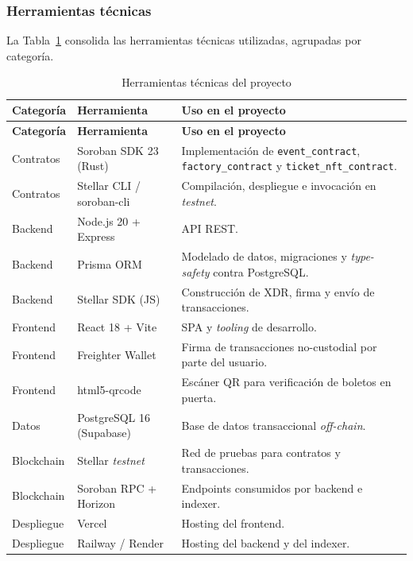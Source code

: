 \documentclass[12pt,oneside]{report}
\begin{document}
      \subsubsection{Herramientas técnicas}
      La Tabla~\ref{tab:herramientas-tecnicas} consolida las herramientas técnicas utilizadas, agrupadas por categoría.

      \begin{longtable}{@{}p{3.3cm} p{4.0cm} p{7.5cm}@{}}
        \caption{Herramientas técnicas del proyecto}
        \label{tab:herramientas-tecnicas}\\
        \toprule
        \textbf{Categoría} & \textbf{Herramienta} & \textbf{Uso en el proyecto}\\
        \midrule
        \endfirsthead
        \toprule
        \textbf{Categoría} & \textbf{Herramienta} & \textbf{Uso en el proyecto}\\
        \midrule
        \endhead
        \bottomrule
        \endfoot
        Contratos & Soroban SDK 23 (Rust) & Implementación de \texttt{event\_contract}, \texttt{factory\_contract} y \texttt{ticket\_nft\_contract}.\\
        Contratos & Stellar CLI / soroban-cli & Compilación, despliegue e invocación en \textit{testnet}.\\
        Backend & Node.js 20 + Express & API REST.\\
        Backend & Prisma ORM & Modelado de datos, migraciones y \textit{type-safety} contra PostgreSQL.\\
        Backend & Stellar SDK (JS) & Construcción de XDR, firma y envío de transacciones.\\
        Frontend & React 18 + Vite & SPA y \textit{tooling} de desarrollo.\\
        Frontend & Freighter Wallet & Firma de transacciones no-custodial por parte del usuario.\\
        Frontend & html5-qrcode & Escáner QR para verificación de boletos en puerta.\\
        Datos & PostgreSQL 16 (Supabase) & Base de datos transaccional \textit{off-chain}.\\
        Blockchain & Stellar \textit{testnet} & Red de pruebas para contratos y transacciones.\\
        Blockchain & Soroban RPC + Horizon & Endpoints consumidos por backend e indexer.\\
        Despliegue & Vercel & Hosting del frontend.\\
        Despliegue & Railway / Render & Hosting del backend y del indexer.\\

\end{longtable}
\end{document}
